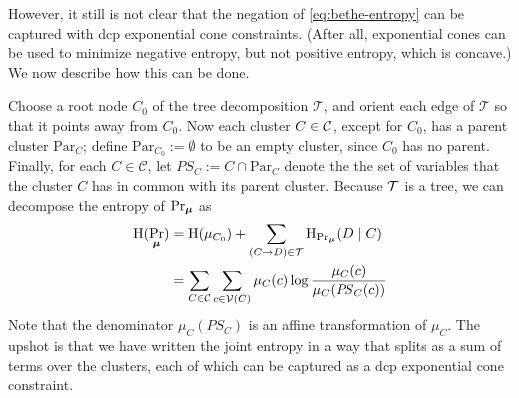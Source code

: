 \documentclass[twoside]{article}
\begin{document}
However, 
it still is not clear that the negation of \eqref{eq:bethe-entropy} can be 
captured with dcp exponential cone constraints.
(After all, exponential cones can be used to minimize negative entropy, but not positive entropy, which is concave.) 
We now describe how this can be done.

\def\Par{\mathrm{Par}}
\def\Pash{\mathit{P\!S}}

Choose a root node $C_0$ of the tree decomposition $\mathcal T$, and orient each edge of $\mathcal T$ so that it points away from $C_0$. 
Now each cluster $C \in \cal C$, except for $C_0$, has a parent cluster $\Par_C$;
define $\Par_{C_0} := \emptyset$ to be an empty cluster, since $C_0$ has no parent. 
Finally, for each $C \in \mathcal C$, let $\Pash_C := C \cap \Par_C$ denote the
the set of variables that the cluster $C$ has in common with its parent cluster.
Because $\cal T$ is a tree, we can decompose the entropy of $\Pr_{\boldsymbol\mu}$ as 
%
\begin{align*}
    \H(\Pr_{\bmu}) &= 
        \H(\mu_{C_0}) + 
        \sum_{(C \to D) \in \mathcal T}
        \H_{\Pr_{\bmu}}(D \mid C)\\
    &= \sum_{C \in \cal C} 
        \sum_{c \in \V(C)} \mu_C(c) \log \frac
            {\mu_C(c)}{\mu_C( \Pash_C(c) )}
\end{align*}
%
Note that the denominator $\mu_C(\Pash_C)$ is an affine transformation of $\mu_C$.
The upshot is that we have written the joint entropy in a way that 
splits as a sum of terms over the clusters, each of which can be captured as a dcp exponential cone constraint. 
\end{document}
